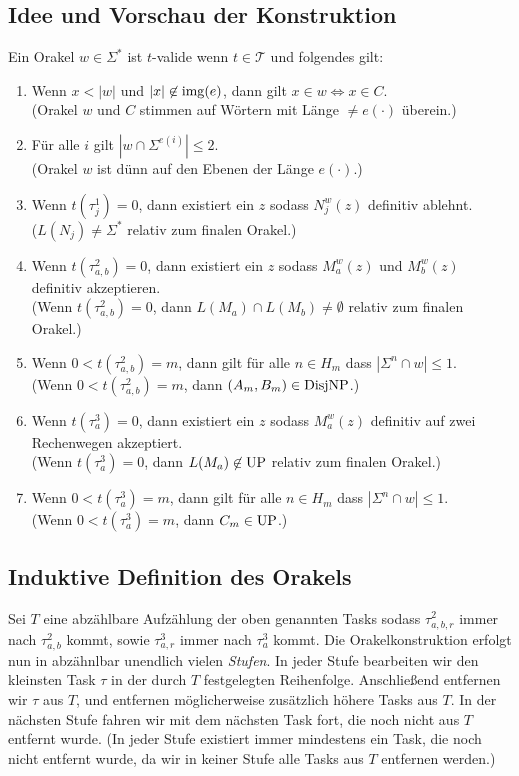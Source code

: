 \subsection*{Idee und Vorschau der Konstruktion}

Ein Orakel $w\in\Sigma^*$ ist $t$-valide wenn $t\in\mathcal T$ und folgendes gilt:
\begin{enumerate}[label={V\arabic*}]
    \item Wenn $x<|w|$ und $|x|\not\in \operatorname{img}(e)$, dann gilt $x\in w\iff x\in C$.\\
        (Orakel $w$ und $C$ stimmen auf Wörtern mit Länge $\neq e(\cdot)$ überein.)
    \item Für alle $i$ gilt $|w\cap \Sigma^{e(i)}|\leq 2$.\\
        (Orakel $w$ ist dünn auf den Ebenen der Länge $e(\cdot)$.)
    \item Wenn $t(\tau^1_j)=0$, dann existiert ein $z$ sodass $N_j^w(z)$ definitiv ablehnt.\\
        ($L(N_j)\neq \Sigma^*$ relativ zum finalen Orakel.)
    \item Wenn $t(\tau^2_{a,b})=0$, dann existiert ein $z$ sodass $M_a^w(z)$ und $M_b^w(z)$ definitiv akzeptieren.\\
        (Wenn $t(\tau^2_{a,b})=0$, dann $L(M_a)\cap L(M_b)\neq \emptyset$ relativ zum finalen Orakel.)
    \item Wenn $0<t(\tau^2_{a,b})=m$, dann gilt für alle $n\in H_m$ dass $|\Sigma^{n}\cap w|\leq 1$.\\
        (Wenn $0<t(\tau^2_{a,b})=m$, dann $(A_m,B_m)\in\mathrm{DisjNP}$.)
    \item Wenn $t(\tau^3_{a})=0$, dann existiert ein $z$ sodass $M_a^w(z)$ definitiv auf zwei Rechenwegen akzeptiert.\\
        (Wenn $t(\tau^3_{a})=0$, dann $L(M_a)\not\in \mathrm{UP}$ relativ zum finalen Orakel.)
    \item Wenn $0<t(\tau^3_{a})=m$, dann gilt für alle $n\in H_m$ dass $|\Sigma^n\cap w|\leq 1$.\\
        (Wenn $0<t(\tau^3_{a})=m$, dann $C_m\in\mathrm{UP}$.)
\end{enumerate}


\subsection*{Induktive Definition des Orakels}

Sei $T$ eine abzählbare Aufzählung der oben genannten Tasks sodass $\tau^2_{a,b,r}$ immer nach $\tau^2_{a,b}$ kommt, sowie $\tau^3_{a,r}$ immer nach $\tau^3_a$ kommt.
Die Orakelkonstruktion erfolgt nun in abzähnlbar unendlich vielen \emph{Stufen}. In jeder Stufe bearbeiten wir den kleinsten Task $\tau$ in der durch $T$ festgelegten Reihenfolge. Anschließend entfernen wir $\tau$ aus $T$, und entfernen möglicherweise zusätzlich höhere Tasks aus $T$.
In der nächsten Stufe fahren wir mit dem nächsten Task fort, die noch nicht aus $T$ entfernt wurde. (In jeder Stufe existiert immer mindestens ein Task, die noch nicht entfernt wurde, da wir in keiner Stufe alle Tasks aus $T$ entfernen werden.)

